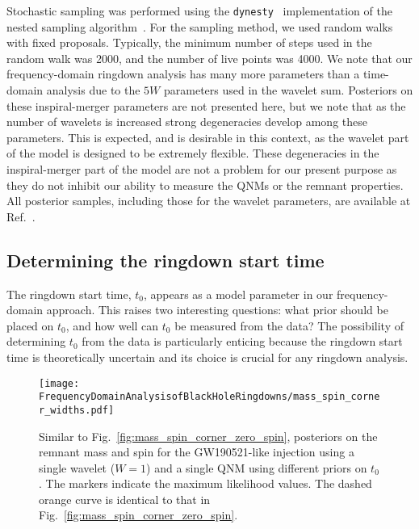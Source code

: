 Stochastic sampling was performed using the \texttt{dynesty}~\cite{Speagle:2019ivv} implementation of the nested sampling algorithm~\cite{doi:10.1063/1.1835238, Skilling:2006gxv}.
For the sampling method, we used random walks with fixed proposals.
Typically, the minimum number of steps used in the random walk was 2000, and the number of live points was 4000.
We note that our frequency-domain ringdown analysis has many more parameters than a time-domain analysis due to the $5W$ parameters used in the wavelet sum.
Posteriors on these inspiral-merger parameters are not presented here, but we note that as the number of wavelets is increased strong degeneracies develop among these parameters.
This is expected, and is desirable in this context, as the wavelet part of the model is designed to be extremely flexible. 
These degeneracies in the inspiral-merger part of the model are not a problem for our present purpose as they do not inhibit our ability to measure the QNMs or the remnant properties. 
All posterior samples, including those for the wavelet parameters, are available at Ref.~\cite{finch_eliot_2021_5569759}.


\subsection{Determining the ringdown start time}\label{subsec:t0}

The ringdown start time, $t_0$, appears as a model parameter in our frequency-domain approach.
This raises two interesting questions: what prior should be placed on $t_0$, and how well can $t_0$ be measured from the data?
The possibility of determining $t_0$ from the data is particularly enticing because the ringdown start time is theoretically uncertain and its choice is crucial for any ringdown analysis.

\begin{figure}[t!]
    \centering
    \texttt{[image: FrequencyDomainAnalysisofBlackHoleRingdowns/mass\_spin\_corner\_widths.pdf]}
    \caption[Similar to Fig.~\ref{fig:mass_spin_corner_zero_spin}, posteriors on the remnant mass and spin for the GW190521-like injection using a single wavelet ($W=1$) and a single QNM using different priors on $t_0$]{ 
    Similar to Fig.~\ref{fig:mass_spin_corner_zero_spin}, posteriors on the remnant mass and spin for the GW190521-like injection using a single wavelet ($W=1$) and a single QNM using different priors on $t_0$.
    The markers indicate the maximum likelihood values.
    The dashed orange curve is identical to that in Fig.~\ref{fig:mass_spin_corner_zero_spin}.
    }
    \label{fig:start_time_prior}
\end{figure}

